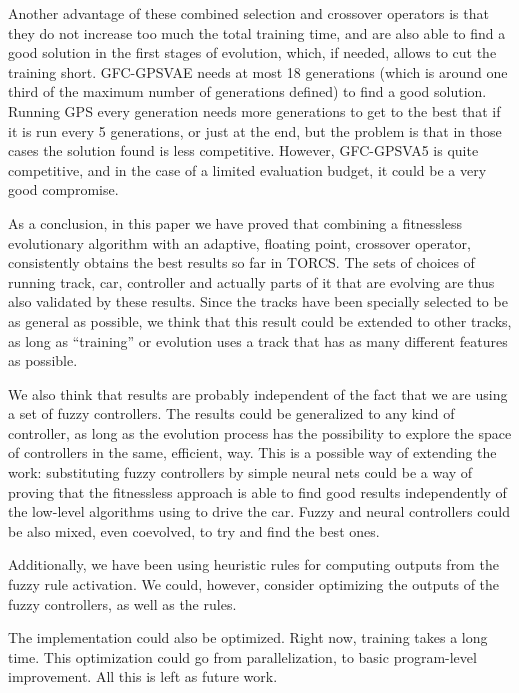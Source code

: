 \documentclass[10pt,journal,compsoc]{IEEEtran}
\begin{document}
Another advantage of these combined selection and crossover operators is that they do not
increase too much the total training time, and are also able to find a good solution in the first stages of evolution, which, if needed, allows to cut the training short. {\sf GFC-GPSVAE} needs at most 18 generations (which is around one third of the maximum number of generations defined) to find a good solution. Running GPS every generation needs more generations to get to the best that if it is run every 5 generations, or just at the end, but the problem is that in those cases the solution found is less competitive. However, {\sf GFC-GPSVA5} is quite competitive, and in the case of a limited evaluation budget, it could be a very good compromise.

As a conclusion, in this paper we have proved that combining a
fitnessless evolutionary algorithm with an adaptive, floating point,
crossover operator, consistently obtains the best results so far in
TORCS. The sets of choices of running track, car, controller and
actually parts of it that are evolving are thus also validated by
these results. Since the tracks have been specially selected to be as
general as possible, we think that this result could be extended to
other tracks, as long as ``training'' or evolution uses a track that
has as many different features as possible. %

We also think that results are probably independent of the fact that we are using a set of fuzzy controllers. The results could be generalized to any kind
of controller, as long as the evolution process has the possibility to explore the space of controllers in the same, efficient, way. This is a possible
way of extending the work: substituting fuzzy controllers by simple
neural nets could be a way of proving that the fitnessless approach
is able to find good results independently of the low-level algorithms
using to drive the car. Fuzzy and neural controllers could be also
mixed, even coevolved, to try and find the best ones. 

Additionally, we have been using heuristic rules for computing outputs
from the fuzzy rule activation. We could, however, consider optimizing
the outputs of the fuzzy controllers, as well as the rules.

The implementation could also be optimized. Right now, training takes
a long time. This optimization could go from parallelization, to basic
program-level improvement. All this is left as future work.
\end{document}
